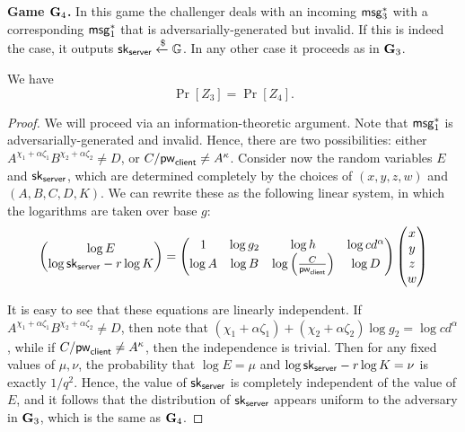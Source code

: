 \textbf{Game $\mathbf{G}_4$.} In this game the challenger deals with an incoming $\mathsf{msg}_{3}^{*}$ with a corresponding $\mathsf{msg}_{1}^{*}$ that is adversarially-generated but invalid. If this is indeed the case, it outputs $\mathsf{sk}_{\mathsf{server}}\xleftarrow{\$}\mathbb{G}$. In any other case it proceeds as in $\mathbf{G}_3$.

\begin{lemma}
	We have $$\Pr[Z_3]=\Pr[Z_4].$$
\end{lemma}
\begin{proof}
	We will proceed via an information-theoretic argument. Note that $\mathsf{msg}_{1}^{*}$ is adversarially-generated and invalid. Hence, there are two possibilities: either $A^{\chi_1+\alpha\zeta_1}B^{\chi_2+\alpha\zeta_2}\neq D$, or $C/\mathsf{pw}_{\mathsf{client}}\neq A^\kappa$. Consider now the random variables $E$ and $\mathsf{sk}_{\mathsf{server}}$, which are determined completely by the choices of $(x,y,z,w)$ and $(A,B,C,D,K)$. We can rewrite these as the following linear system, in which the logarithms are taken over base $g$:
	\begin{equation}
		\label{eq:linear}
		\begin{pmatrix}
			\log E\\
			\log\mathsf{sk}_{\mathsf{server}}-r\log K
		\end{pmatrix} =
		\begin{pmatrix}
			1 & \log g_2 & \log h & \log cd^\alpha\\
			\log A& \log B & \log \left(\frac{C}{\mathsf{pw}_{\mathsf{client}}}\right) & \log D
		\end{pmatrix}
		\begin{pmatrix}
			x\\
			y\\
			z\\
			w
		\end{pmatrix}
	\end{equation}

	It is easy to see that these equations are linearly independent. If $A^{\chi_1+\alpha\zeta_1}B^{\chi_2+\alpha\zeta_2}\neq D$, then note that $(\chi_1+\alpha\zeta_1) + (\chi_2+\alpha\zeta_2)\log g_2 = \log cd^{\alpha}$, while if $C/\mathsf{pw}_{\mathsf{client}}\neq A^\kappa$, then the independence is trivial. Then for any fixed values of $\mu, \nu$, the probability that $\log E=\mu$ and $\log\mathsf{sk}_{\mathsf{server}}-r\log K=\nu$ is exactly $1/q^2$. Hence, the value of $\mathsf{sk}_{\mathsf{server}}$ is completely independent of the value of $E$, and it follows that the distribution of $\mathsf{sk}_{\mathsf{server}}$ appears uniform to the adversary in $\mathbf{G}_3$, which is the same as $\mathbf{G}_4$.
\end{proof}


